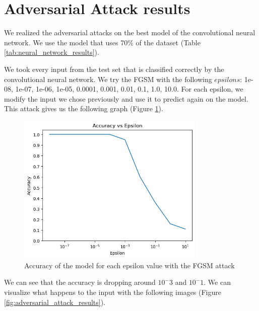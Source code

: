 \section{Adversarial Attack results}

We realized the adversarial attacks on the best model of the convolutional neural network. We use the model that uses 70\% of the dataset (Table \ref{tab:neural_network_results}).

We took every input from the test set that is classified correctly by the convolutional neural network. We try the FGSM with the following $epsilons$: 1e-08, 1e-07, 1e-06, 1e-05, 0.0001, 0.001, 0.01, 0.1, 1.0, 10.0. For each epsilon, we modify the input we chose previously and use it to predict again on the model. This attack gives us the following graph (Figure \ref{fig:fgsm_results}).

\begin{figure}[H]
    \centering
    \includegraphics[width=0.8\textwidth]{images/fgsm_results.png}
    \caption{Accuracy of the model for each epsilon value with the FGSM attack}
    \label{fig:fgsm_results}
\end{figure}

We can see that the accuracy is dropping around $10^-3$ and $10^-1$. We can visualize what happens to the input with the following images (Figure \ref{fig:adversarial_attack_results}).

